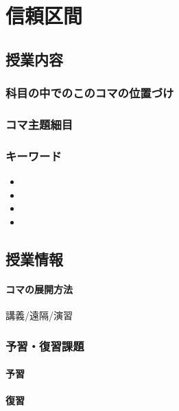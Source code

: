 \section{信頼区間}
\subsection{授業内容}
\subsubsection{科目の中でのこのコマの位置づけ}


\subsubsection{コマ主題細目}
\begin{description}


\end{description}
\subsubsection{キーワード}
\begin{itemize}
	\item 
	\item 
	\item 
	\item 
\end{itemize}
\subsection{授業情報}
\paragraph{コマの展開方法}
講義/遠隔/演習
\subsubsection{予習・復習課題}
\paragraph{予習}
\paragraph{復習}
